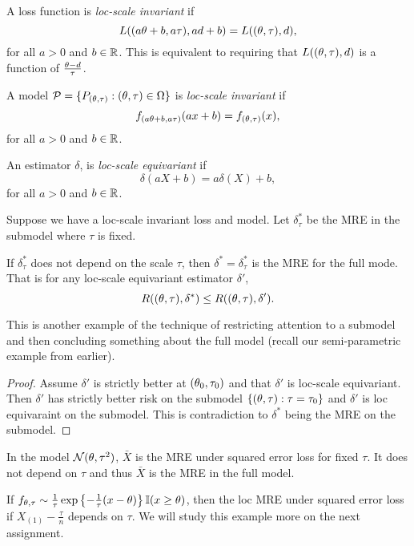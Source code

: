 \begin{defn}
    A loss function is \emph{loc-scale invariant} if 
    \[L((a{\theta}+b,a\tau), ad+b) = L(({\theta},\tau),d), \]
    for all $a >0$ and $b \in {\mathbb R}$. This is equivalent to requiring that $L(({\theta},\tau),d)$ is a function of $\frac{{\theta}-d}{\tau}$.
\end{defn}

\begin{defn}
    A model ${\mathcal{P}} = \{P_{({\theta},\tau)} : ({\theta},\tau) \in {{\Omega}} \}$ is \emph{loc-scale invariant} if 
    \[f_{(a{\theta}+b,a\tau)}(ax+b) = f_{({\theta},\tau)}(x), \]
    for all $a >0$ and $b \in {\mathbb R}$.
\end{defn}
\begin{defn}
    An estimator $\delta$, is \emph{loc-scale equivariant} if 
    \[\delta(aX+b) = a\delta(X)+b, \]
    for all $a > 0$ and $b \in {\mathbb R}$.
\end{defn}

\begin{thrm}
    Suppose we have a loc-scale invariant loss and model. Let $\delta_\tau^*$ be the MRE in the submodel where $\tau$ is fixed.

    If $\delta_\tau^*$ does not depend on the scale $\tau$, then $\delta^* = \delta_\tau^*$ is the MRE for the full mode. That is for any loc-scale equivariant estimator $\delta'$,
    \[R(({\theta},\tau), \delta^*) \le R(({\theta},\tau), \delta'). \]
\end{thrm}
This is another example of the technique of restricting attention to a submodel and then concluding something about the full model (recall our semi-parametric example from earlier).
\begin{proof}
    Assume $\delta'$ is strictly better at $({\theta}_0,\tau_0)$ and that $\delta'$ is loc-scale equivariant. Then $\delta'$ has strictly better risk on the submodel $\{({\theta},\tau): \tau= \tau_0\}$ and $\delta'$ is loc equivaraint on the submodel. This is contradiction to $\delta^*$ being the MRE on the submodel.
\end{proof}

\begin{ex}
    In the model ${{\mathcal{N}}}({\theta},\tau^2)$, $\bar{X}$ is the MRE under squared error loss for fixed $\tau$. It does not depend on $\tau$ and thus $\bar{X}$ is the MRE in the full model.
\end{ex}

\begin{ex}
    If $f_{{\theta},\tau} \sim \frac{1}{\tau} \exp\left\{-\frac{1}{\tau}(x-{\theta})\right\}\mathbb{I}(x\ge {\theta})$, then the loc MRE under squared error loss if $X_{(1)}-\frac{\tau}{n}$ depends on $\tau$. We will study this example more on the next assignment.
\end{ex}

